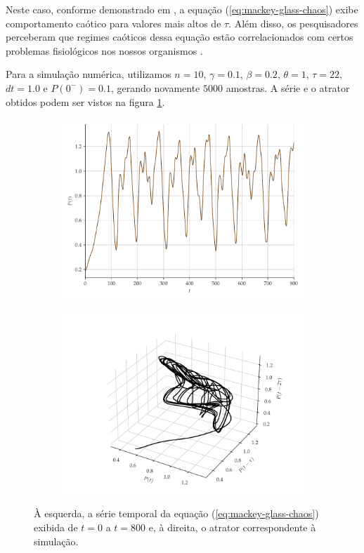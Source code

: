 \documentclass[a4paper, 12pt]{article}
\begin{document}
Neste caso, conforme demonstrado em \cite{mackey1977oscillation}, a equação (\ref{eq:mackey-glass-chaos}) exibe comportamento caótico para valores mais altos de $\tau$. Além disso, os pesquisadores perceberam que regimes caóticos dessa equação estão correlacionados com certos problemas fisiológicos nos nossos organismos \cite{mackey1977oscillation}.

Para a simulação numérica, utilizamos $n = 10$, $\gamma = 0.1$, $\beta = 0.2$, $\theta = 1$, $\tau = 22$, $dt = 1.0$ e $P(0^-)=0.1$, gerando novamente $5000$ amostras. A série e o atrator obtidos podem ser vistos na figura \ref{fig:mackey-glass}.
\begin{figure}[!ht]
     \begin{subfigure}[t]{0.35\textwidth}
         \includegraphics[scale=0.35]{serie-mackeyglass.pdf}
     \end{subfigure}
     \centering
     \begin{subfigure}[t]{0.35\textwidth}
         \includegraphics[scale=0.39]{atrator-mackeyglass.pdf}
     \end{subfigure}
     \caption{À esquerda, a série temporal da equação (\ref{eq:mackey-glass-chaos}) exibida de $t = 0 $ a $t = 800$ e, à direita, o atrator correspondente à simulação.}
     \label{fig:mackey-glass}
\end{figure}
\end{document}
